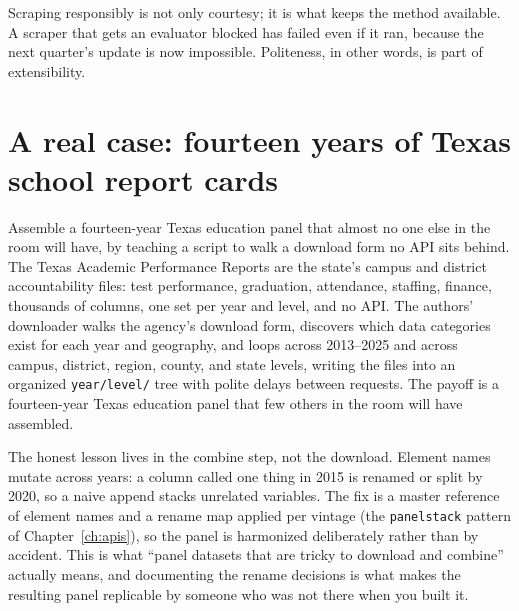 \documentclass[
    a4paper,
    fontsize=10pt,
    twoside=true,
    numbers=noenddot,
]{kaobook}
\begin{document}
Scraping responsibly is not only courtesy; it is what keeps the method available. A scraper that gets an evaluator blocked has failed even if it ran, because the next quarter's update is now impossible. Politeness, in other words, is part of extensibility.

\section{A real case: fourteen years of Texas school report cards}
Assemble a fourteen-year Texas education panel that almost no one else in the room will have, by teaching a script to walk a download form no API sits behind. The Texas Academic Performance Reports are the state's campus and district accountability files: test performance, graduation, attendance, staffing, finance, thousands of columns, one set per year and level, and no API. The authors' downloader walks the agency's download form, discovers which data categories exist for each year and geography, and loops across 2013--2025 and across campus, district, region, county, and state levels, writing the files into an organized \texttt{year/level/} tree with polite delays between requests. The payoff is a fourteen-year Texas education panel that few others in the room will have assembled.

The honest lesson lives in the combine step, not the download. Element names mutate across years: a column called one thing in 2015 is renamed or split by 2020, so a naive append stacks unrelated variables. The fix is a master reference of element names and a rename map applied per vintage (the \texttt{panelstack} pattern of Chapter~\ref{ch:apis}), so the panel is harmonized deliberately rather than by accident. This is what \enquote{panel datasets that are tricky to download and combine} actually means, and documenting the rename decisions is what makes the resulting panel replicable by someone who was not there when you built it.
\end{document}
